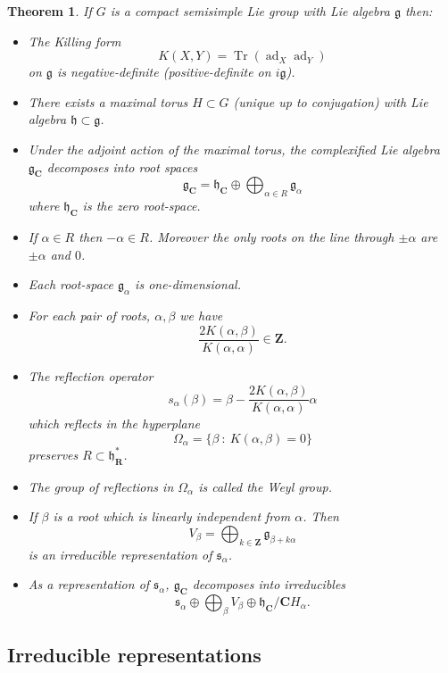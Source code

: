 \documentclass[12pt]{article}
\newcommand{\CC}{\mathbf{C}}
\newcommand{\RR}{\mathbf{R}}
\newcommand{\ZZ}{\mathbf{Z}}
\newcommand{\OP}{\operatorname}
\newcommand{\ad}{\OP{ad}}
\newtheorem{thm}{Theorem}[section]
\theoremstyle{definition}
\theoremstyle{check}
\theoremstyle{remark}
\theoremstyle{TheoremNum}
\begin{document}
\begin{thm}
If $G$ is a compact semisimple Lie group with Lie algebra $\mathfrak{g}$ then:
\begin{itemize}
\item The Killing form
\[K(X,Y)=\OP{Tr}(\ad_X\ad_Y)\]
on $\mathfrak{g}$ is negative-definite (positive-definite on $i\mathfrak{g}$).
\item There exists a maximal torus $H\subset G$ (unique up to conjugation) with Lie algebra $\mathfrak{h}\subset\mathfrak{g}$.
\item Under the adjoint action of the maximal torus, the complexified Lie algebra $\mathfrak{g}_{\CC}$ decomposes into root spaces
\[\mathfrak{g}_{\CC}=\mathfrak{h}_{\CC}\oplus\bigoplus_{\alpha\in R}\mathfrak{g}_{\alpha}\]
where $\mathfrak{h}_{\CC}$ is the zero root-space.
\item If $\alpha\in R$ then $-\alpha\in R$. Moreover the only roots on the line through $\pm\alpha$ are $\pm\alpha$ and $0$.
\item Each root-space $\mathfrak{g}_{\alpha}$ is one-dimensional.
\item For each pair of roots, $\alpha,\beta$ we have
\[\frac{2K(\alpha,\beta)}{K(\alpha,\alpha)}\in\ZZ.\]
\item The reflection operator
\[s_{\alpha}(\beta)=\beta-\frac{2K(\alpha,\beta)}{K(\alpha,\alpha)}\alpha\]
which reflects in the hyperplane
\[\Omega_{\alpha}=\{\beta\ :\ K(\alpha,\beta)=0\}\]
preserves $R\subset\mathfrak{h}_{\RR}^*$.
\item The group of reflections in $\Omega_{\alpha}$ is called the Weyl group.
\item If $\beta$ is a root which is linearly independent from $\alpha$. Then
\[V_{\beta}=\bigoplus_{k\in\ZZ}\mathfrak{g}_{\beta+k\alpha}\]
is an irreducible representation of $\mathfrak{s}_{\alpha}$.
\item As a representation of $\mathfrak{s}_{\alpha}$, $\mathfrak{g}_{\CC}$ decomposes into irreducibles
\[\mathfrak{s}_{\alpha}\oplus\bigoplus_{\beta}V_{\beta}\oplus\mathfrak{h}_{\CC}/\CC H_{\alpha}.\]
\end{itemize}
\end{thm}

\subsection{Irreducible representations}
\end{document}

